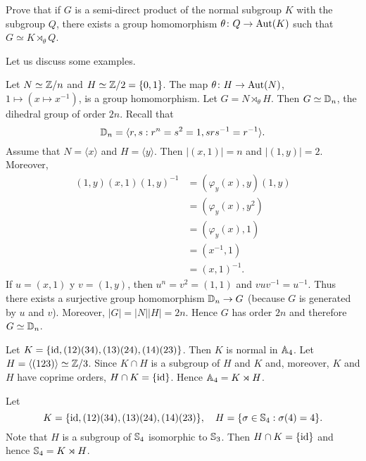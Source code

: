 \begin{exercise}
Prove that if $G$ is a semi-direct product of the normal subgroup 
$K$ with the subgroup $Q$, there exists a group homomorphism 
$\theta\colon Q\to\operatorname{Aut}(K)$
such that $G\simeq K\rtimes_\theta Q$.
\end{exercise}


Let us discuss some examples. 

\begin{example}
Let $N\simeq \mathbb{Z}/n$ and $H\simeq\mathbb{Z}/2=\{0,1\}$. The map $\theta\colon H\to\operatorname{Aut}(N)$, 
$1\mapsto (x\mapsto x^{-1})$, is a group homomorphism. Let $G=N\rtimes_\theta H$.
Then $G\simeq\mathbb{D}_n$, the dihedral group of order $2n$.
Recall that 
\[
\mathbb{D}_n=\langle r,s:r^n=s^2=1, srs^{-1}=r^{-1}\rangle.
\]
Assume that $N=\langle x\rangle$ and $H=\langle y\rangle$. Then $|(x,1)|=n$ and $|(1,y)|=2$. 
Moreover,
\begin{align*}
(1,y)(x,1)(1,y)^{-1} &= (\varphi_y(x),y)(1,y)\\
&=(\varphi_y(x),y^2)\\
&=(\varphi_y(x),1)\\
&=(x^{-1},1)\\
&=(x,1)^{-1}.
\end{align*}
If $u=(x,1)$ y $v=(1,y)$, then $u^n=v^2=(1,1)$ and $vuv^{-1}=u^{-1}$. Thus there exists 
a surjective group homomorphism 
$\mathbb{D}_n\to G$ (because $G$ is generated by $u$ and $v$). Moreover, $|G|=|N||H|=2n$. Hence 
$G$ has order $2n$ and therefore $G\simeq\mathbb{D}_n$.
\end{example}

\begin{example}
Let $K=\{\operatorname{id},(12)(34),(13)(24),(14)(23)\}$. Then $K$ is normal in $\mathbb{A}_4$. 
Let $H=\langle (123)\rangle\simeq\mathbb{Z}/3$. Since $K\cap H$ is a subgroup of $H$ and $K$ and, moreover, 
$K$ and $H$ have coprime orders, $H\cap K=\{\operatorname{id}\}$. Hence $\mathbb{A}_4=K\rtimes H$.
\end{example}

\begin{example}
Let 
\[
K=\{\operatorname{id},(12)(34),(13)(24),(14)(23)\},\quad  
H=\{\sigma\in\mathbb{S}_4:\sigma(4)=4\}.
\]
Note that $H$ is a subgroup of 
$\mathbb{S}_4$ isomorphic to $\mathbb{S}_3$. Then $H\cap K=\{\operatorname{id}\}$ and hence 
$\mathbb{S}_4=K\rtimes H$.
\end{example}

